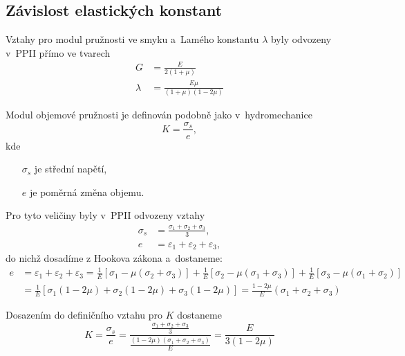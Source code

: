 
\subsection{Závislost elastických konstant}
Vztahy pro modul pružnosti ve smyku a~Lamého konstantu $\lambda$ byly odvozeny v~PPII přímo ve tvarech
\begin{align}
	G &= \frac{E}{2(1+\mu)}\\
	\lambda &= \frac{E \mu}{(1+\mu) (1-2\mu)}
\end{align}

Modul objemové pružnosti je definován podobně jako v~hydromechanice
\begin{equation}
	K = \frac{\sigma_s}{e},
\end{equation}
kde
\begin{itemize}
	\item[$\sigma_s$] je střední napětí,
	\item[$e$] je poměrná změna objemu.
\end{itemize}

Pro tyto veličiny byly v~PPII odvozeny vztahy
\begin{align}
	\sigma_s &= \frac{\sigma_1 + \sigma_2 + \sigma_3}{3},\\
	e &= \varepsilon_1 + \varepsilon_2 + \varepsilon_3,
\end{align}
do nichž dosadíme z Hookova zákona a~dostaneme:
\begin{equation}\begin{split}
	e
	&= \varepsilon_1 + \varepsilon_2 + \varepsilon_3
	= \frac{1}{E} \left[\sigma_1 - \mu(\sigma_2 + \sigma_3)\right]
	+ \frac{1}{E} \left[\sigma_2 - \mu(\sigma_1 + \sigma_3)\right]
	+ \frac{1}{E} \left[\sigma_3 - \mu(\sigma_1 + \sigma_2)\right]\\
	&= \frac{1}{E} \left[\sigma_1 (1-2\mu) + \sigma_2 (1-2\mu) + \sigma_3 (1-2\mu)\right]
	= \frac{1-2\mu}{E} \left(\sigma_1 + \sigma_2 + \sigma_3\right)
\end{split}\end{equation}

Dosazením do definičního vztahu pro $K$ dostaneme
\begin{equation}
	K
	= \frac{\sigma_s}{e}
	= \frac{\frac{\sigma_1 + \sigma_2 + \sigma_3}{3}}{\frac{(1-2\mu) (\sigma_1 + \sigma_2 + \sigma_3)}{E}}
	= \frac{E}{3 (1-2\mu)}
\end{equation}

